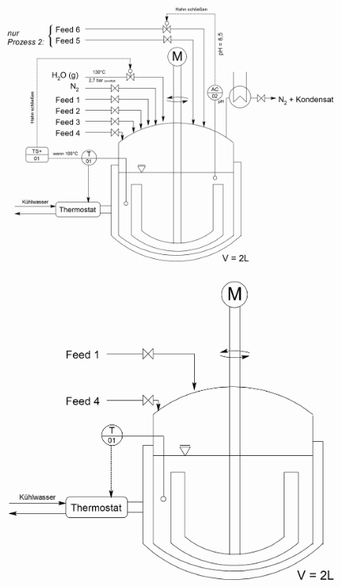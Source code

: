 \begin{figure}
	\centering
	\begin{minipage}{.5\textwidth}
		\centering
		\includegraphics[width=1.0\linewidth]{img/Skizze_Prozess_gesamt.png}
		\label{fig:prozess 1}
	\end{minipage}%
	\hfill
	\begin{minipage}{.45\textwidth}
		\centering
		\includegraphics[width=0.75\linewidth]{img/Skizze_Prozess_1_vereinfacht.png}
		\label{fig:prozess 1_vereinfacht}
	\end{minipage}
\end{figure}
